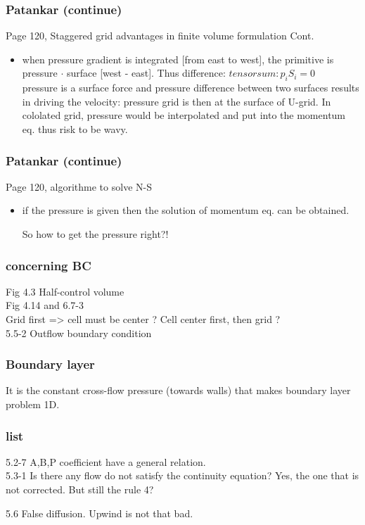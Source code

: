 \documentclass{beamer}
\begin{document}
\begin{frame}
\frametitle{Patankar (continue)}
\begin{block}{Page 120, Staggered grid advantages in finite volume formulation Cont.}
\begin{itemize}

\item when pressure gradient is integrated [from east to west], the primitive is pressure $\cdot$ surface [west - east]. Thus difference: $ tensor sum : p_i S_i = 0$ \\

pressure is a surface force and pressure difference between two surfaces results in driving the velocity: pressure grid is then at the surface of U-grid. In cololated grid, pressure would be interpolated and put into the momentum eq. thus risk to be wavy.
\end{itemize}
\end{block}
\end{frame}
\begin{frame}
\frametitle{Patankar (continue)}
\begin{block}{Page 120, algorithme to solve N-S}
\begin{itemize}
\item if the pressure is given then the solution of momentum eq. can be obtained.

So how to get the pressure right?!

\end{itemize}
\end{block}
\end{frame}


\begin{frame}
\frametitle{concerning BC}
Fig 4.3 Half-control volume \\
Fig 4.14 and 6.7-3 \\

Grid first => cell must be center ?
Cell center first, then grid ? \\


5.5-2 Outflow boundary condition

\end{frame}

\begin{frame}
\frametitle{Boundary layer}
It is the constant cross-flow pressure (towards walls) that makes boundary layer problem 1D.

\end{frame}
\begin{frame}
\frametitle{list}

5.2-7 A,B,P coefficient have a general relation. \\

5.3-1 Is there any flow do not satisfy the continuity equation? Yes, the one that is not corrected. But still the rule 4?

5.6 False diffusion. Upwind is not that bad.

\end{frame}
\end{document}
